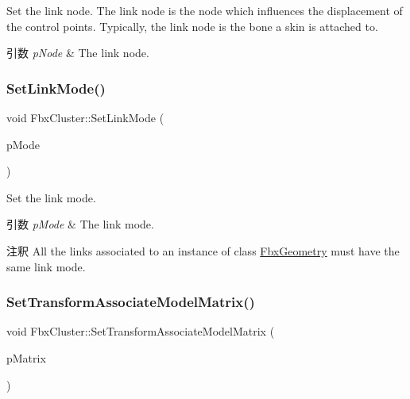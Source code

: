 Set the link node. The link node is the node which influences the displacement of the control points. Typically, the link node is the bone a skin is attached to. 
\begin{DoxyParams}{引数}
{\em p\+Node} & The link node. \\
\hline
\end{DoxyParams}
\mbox{\label{class_fbx_cluster_a13e98718c3604a08b7ac4c29ce763b2f}} 
\subsubsection{\texorpdfstring{Set\+Link\+Mode()}{SetLinkMode()}}
{\footnotesize\ttfamily void Fbx\+Cluster\+::\+Set\+Link\+Mode (\begin{DoxyParamCaption}\item[{\hyperlink{class_fbx_cluster_aaa2afaedfd33eda65c46bb5a3d04dab0}{E\+Link\+Mode}}]{p\+Mode }\end{DoxyParamCaption})}

Set the link mode. 
\begin{DoxyParams}{引数}
{\em p\+Mode} & The link mode. \\
\hline
\end{DoxyParams}
\begin{DoxyRemark}{注釈}
All the links associated to an instance of class \hyperlink{class_fbx_geometry}{Fbx\+Geometry} must have the same link mode. 
\end{DoxyRemark}
\mbox{\label{class_fbx_cluster_a8fd73a9d50d6bf35146c524cb49871aa}} 
\subsubsection{\texorpdfstring{Set\+Transform\+Associate\+Model\+Matrix()}{SetTransformAssociateModelMatrix()}}
{\footnotesize\ttfamily void Fbx\+Cluster\+::\+Set\+Transform\+Associate\+Model\+Matrix (\begin{DoxyParamCaption}\item[{const \hyperlink{class_fbx_a_matrix}{Fbx\+A\+Matrix} \&}]{p\+Matrix }\end{DoxyParamCaption})}

